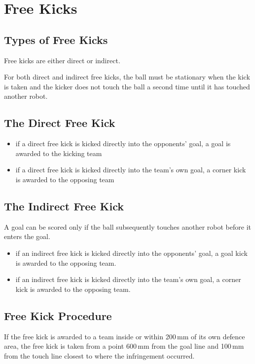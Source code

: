\section{Free Kicks}\label{sec:free-kicks}

\subsection{Types of Free Kicks}
Free kicks are either direct or indirect.

For both direct and indirect free kicks, the ball must be stationary when the kick is taken and the kicker does not touch the ball a second time until it has touched another robot.

\subsection{The Direct Free Kick}
\begin{itemize}
\item if a direct free kick is kicked directly into the opponents' goal, a goal is awarded to the
kicking team
\item if a direct free kick is kicked directly into the team's own goal, a corner kick is awarded
to the
opposing team
\end{itemize}

\subsection{The Indirect Free Kick}
A goal can be scored only if the ball subsequently touches another robot before it enters the goal.

\begin{itemize}
\item if an indirect free kick is kicked directly into the opponents' goal, a goal kick is awarded
to the opposing team.
\item if an indirect free kick is kicked directly into the team's own goal, a corner kick is
awarded to the opposing team.
\end{itemize}

\subsection{Free Kick Procedure}
If the free kick is awarded to a team inside or within 200\,mm of its own defence area, the free kick is taken from a point 600\,mm from the goal line and 100\,mm from the touch line closest to where the infringement occurred.

